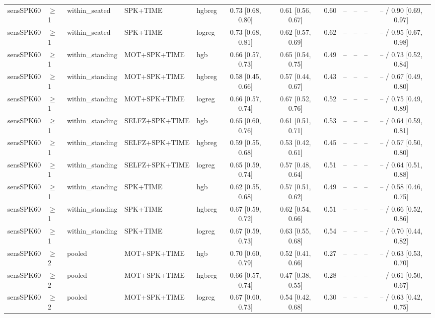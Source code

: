 \begin{longtable}{@{}lllllcccrrrc@{}}
sensSPK60 & $\geq$1 & within\_seated & SPK+TIME & hgbreg & 0.73 [0.68, 0.80] & 0.61 [0.56, 0.67] & 0.60 & -- & -- & -- & -- / 0.90 [0.69, 0.97] \\
sensSPK60 & $\geq$1 & within\_seated & SPK+TIME & logreg & 0.73 [0.68, 0.81] & 0.62 [0.57, 0.69] & 0.62 & -- & -- & -- & -- / 0.95 [0.67, 0.98] \\
sensSPK60 & $\geq$1 & within\_standing & MOT+SPK+TIME & hgb & 0.66 [0.57, 0.73] & 0.65 [0.54, 0.75] & 0.49 & -- & -- & -- & -- / 0.73 [0.52, 0.84] \\
sensSPK60 & $\geq$1 & within\_standing & MOT+SPK+TIME & hgbreg & 0.58 [0.45, 0.66] & 0.57 [0.44, 0.67] & 0.43 & -- & -- & -- & -- / 0.67 [0.49, 0.80] \\
sensSPK60 & $\geq$1 & within\_standing & MOT+SPK+TIME & logreg & 0.66 [0.57, 0.74] & 0.67 [0.52, 0.76] & 0.52 & -- & -- & -- & -- / 0.75 [0.49, 0.89] \\
sensSPK60 & $\geq$1 & within\_standing & SELFZ+SPK+TIME & hgb & 0.65 [0.60, 0.76] & 0.61 [0.51, 0.71] & 0.53 & -- & -- & -- & -- / 0.64 [0.59, 0.81] \\
sensSPK60 & $\geq$1 & within\_standing & SELFZ+SPK+TIME & hgbreg & 0.59 [0.55, 0.68] & 0.53 [0.42, 0.61] & 0.45 & -- & -- & -- & -- / 0.57 [0.50, 0.80] \\
sensSPK60 & $\geq$1 & within\_standing & SELFZ+SPK+TIME & logreg & 0.65 [0.59, 0.74] & 0.57 [0.48, 0.64] & 0.51 & -- & -- & -- & -- / 0.64 [0.51, 0.88] \\
sensSPK60 & $\geq$1 & within\_standing & SPK+TIME & hgb & 0.62 [0.55, 0.68] & 0.57 [0.51, 0.62] & 0.49 & -- & -- & -- & -- / 0.58 [0.46, 0.75] \\
sensSPK60 & $\geq$1 & within\_standing & SPK+TIME & hgbreg & 0.67 [0.59, 0.72] & 0.62 [0.54, 0.66] & 0.51 & -- & -- & -- & -- / 0.66 [0.52, 0.86] \\
sensSPK60 & $\geq$1 & within\_standing & SPK+TIME & logreg & 0.67 [0.59, 0.73] & 0.63 [0.55, 0.68] & 0.54 & -- & -- & -- & -- / 0.70 [0.44, 0.82] \\
sensSPK60 & $\geq$2 & pooled & MOT+SPK+TIME & hgb & 0.70 [0.60, 0.79] & 0.52 [0.41, 0.66] & 0.27 & -- & -- & -- & -- / 0.63 [0.53, 0.70] \\
sensSPK60 & $\geq$2 & pooled & MOT+SPK+TIME & hgbreg & 0.66 [0.57, 0.74] & 0.47 [0.38, 0.55] & 0.28 & -- & -- & -- & -- / 0.61 [0.50, 0.67] \\
sensSPK60 & $\geq$2 & pooled & MOT+SPK+TIME & logreg & 0.67 [0.60, 0.73] & 0.54 [0.42, 0.68] & 0.30 & -- & -- & -- & -- / 0.63 [0.42, 0.75] \\

\end{longtable}
